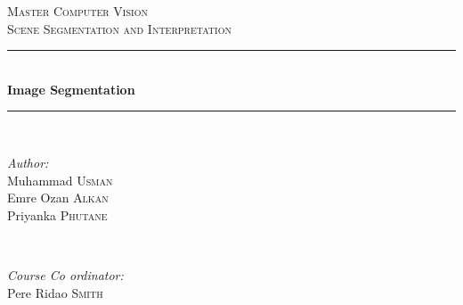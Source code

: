 \documentclass{article}
\begin{document}
\begin{titlepage}

\newcommand{\HRule}{\rule{\linewidth}{0.5mm}} %

\center %
 

\textsc{\LARGE Master Computer Vision}\\[1.5cm] %
\textsc{\Large Scene Segmentation and Interpretation}\\[0.5cm] %



\HRule \\[0.4cm]
{ \huge \bfseries Image Segmentation}\\[0.4cm] %
\HRule \\[1.5cm]
 

\begin{minipage}{0.4\textwidth}
\begin{flushleft} \large
\emph{Author:}\\
Muhammad \textsc{Usman} \\
Emre Ozan \textsc{Alkan}\\
Priyanka \textsc{Phutane}

\end{flushleft}
\end{minipage}
~
\begin{minipage}{0.4\textwidth}
\begin{flushright} \large
\emph{Course Co ordinator:} \\
Pere Ridao \textsc{Smith} %
\end{flushright}
\end{minipage}\\[4cm]



\end{titlepage}
\end{document}
